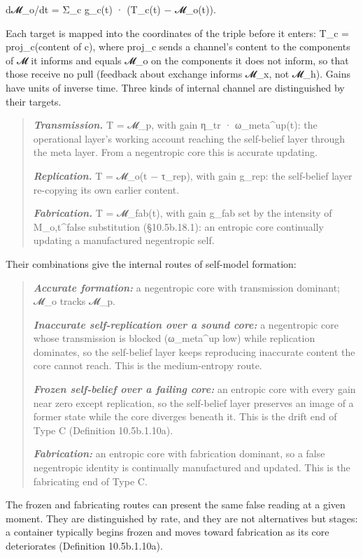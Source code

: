 \documentclass[
]{article}
\begin{document}
d𝓜\_o/dt = Σ\_c g\_c(t) · (T\_c(t) − 𝓜\_o(t)).

Each target is mapped into the coordinates of the triple before it
enters: T\_c = proj\_c(content of c), where proj\_c sends a channel's
content to the components of 𝓜 it informs and equals 𝓜\_o on the
components it does not inform, so that those receive no pull (feedback
about exchange informs 𝓜\_x, not 𝓜\_h). Gains have units of inverse
time. Three kinds of internal channel are distinguished by their
targets.

\begin{quote}
\emph{\textbf{Transmission.}} T = 𝓜\_p, with gain η\_tr ·
ω\_meta\^{}up(t): the operational layer's working account reaching the
self-belief layer through the meta layer. From a negentropic core this
is accurate updating.

\emph{\textbf{Replication.}} T = 𝓜\_o(t − τ\_rep), with gain g\_rep: the
self-belief layer re-copying its own earlier content.

\emph{\textbf{Fabrication.}} T = 𝓜\_fab(t), with gain g\_fab set by the
intensity of M\_o,t\^{}false substitution (§10.5b.18.1): an entropic
core continually updating a manufactured negentropic self.
\end{quote}

Their combinations give the internal routes of self-model formation:

\begin{quote}
\emph{\textbf{Accurate formation:}} a negentropic core with transmission
dominant; 𝓜\_o tracks 𝓜\_p.

\emph{\textbf{Inaccurate self-replication over a sound core:}} a
negentropic core whose transmission is blocked (ω\_meta\^{}up low) while
replication dominates, so the self-belief layer keeps reproducing
inaccurate content the core cannot reach. This is the medium-entropy
route.

\emph{\textbf{Frozen self-belief over a failing core:}} an entropic core
with every gain near zero except replication, so the self-belief layer
preserves an image of a former state while the core diverges beneath it.
This is the drift end of Type C (Definition 10.5b.1.10a).

\emph{\textbf{Fabrication:}} an entropic core with fabrication dominant,
so a false negentropic identity is continually manufactured and updated.
This is the fabricating end of Type C.
\end{quote}

The frozen and fabricating routes can present the same false reading at
a given moment. They are distinguished by rate, and they are not
alternatives but stages: a container typically begins frozen and moves
toward fabrication as its core deteriorates (Definition 10.5b.1.10a).
\end{document}

